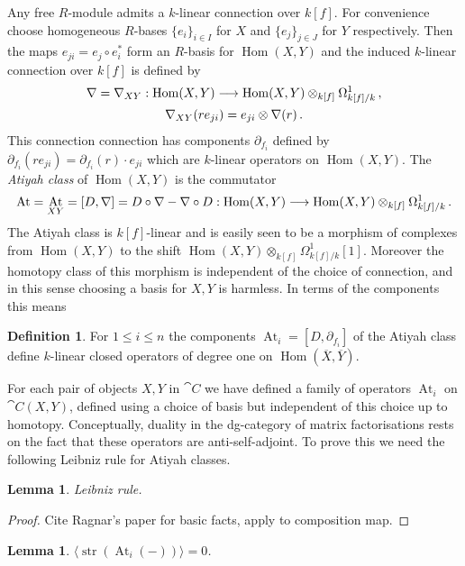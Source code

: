 \documentclass{compositio}
\newtheorem{lemma}[theorem]{Lemma}
\theoremstyle{definition}
\newtheorem{definition}[theorem]{Definition}
\numberwithin{equation}{section}
\def\Hom{\operatorname{Hom}}
\DeclareMathOperator{\str}{str}
\DeclareMathOperator{\At}{At}
\begin{document}
Any free $R$-module admits a $k$-linear connection over $k[f]$. For convenience choose homogeneous $R$-bases $\{ e_i \}_{i \in I}$ for $X$ and $\{ e_j \}_{j \in J}$ for $Y$ respectively. Then the maps $e_{ji} = e_j \circ e_i^*$ form an $R$-basis for $\Hom(X,Y)$ and the induced $k$-linear connection over $k[f]$ is defined by
\begin{gather*}
\nabla = \nabla_{XY}: \Hom(X,Y) \lto \Hom(X,Y) \otimes_{k[f]} \Omega^1_{k[f]/k}\,,\\
\nabla_{XY}( r e_{ji} ) = e_{ji} \otimes \nabla(r)\,.
\end{gather*}
This connection connection has components $\partial_{f_i}$ defined by $\partial_{f_i}( r e_{ji} ) = \partial_{f_i}(r) \cdot e_{ji}$ which are $k$-linear operators on $\Hom(X,Y)$. The \emph{Atiyah class} of $\Hom(X,Y)$ is the commutator
\[
\At = \At_{XY} = [D, \nabla] = D \circ \nabla - \nabla \circ D: \Hom(X,Y) \lto \Hom(X,Y) \otimes_{k[f]} \Omega^1_{k[f]/k}\,.
\]
The Atiyah class is $k[f]$-linear and is easily seen to be a morphism of complexes from $\Hom(X,Y)$ to the shift $\Hom(X,Y) \otimes_{k[f]} \Omega^1_{k[f]/k}[1]$. Moreover the homotopy class of this morphism is independent of the choice of connection, and in this sense choosing a basis for $X,Y$ is harmless. In terms of the components this means


\begin{definition} For $1 \le i \le n$ the components $\At_i = [D, \partial_{f_i}]$ of the Atiyah class define $k$-linear closed operators of degree one on $\Hom(\overline{X}, \overline{Y})$.
\end{definition}

For each pair of objects $X,Y$ in $\cat{C}$ we have defined a family of operators $\At_i$ on $\cat{C}(X,Y)$, defined using a choice of basis but independent of this choice up to homotopy. Conceptually, duality in the dg-category of matrix factorisations rests on the fact that these operators are anti-self-adjoint. To prove this we need the following Leibniz rule for Atiyah classes.

\begin{lemma}\label{lemma:leibnizatiyah} Leibniz rule.
\end{lemma}
\begin{proof}
Cite Ragnar's paper for basic facts, apply to composition map.
\end{proof}

\begin{lemma}\label{lemma:stratiyahzero} $\langle \str( \At_i( - ) ) \rangle = 0$.
\end{lemma}
\end{document}
